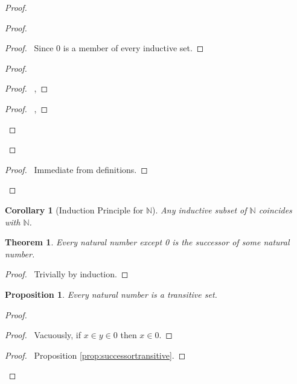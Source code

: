 \documentclass{book}
\let\qed\relax
\newtheorem{prop}[ax]{Proposition}
\newtheorem{cor}{Corollary}[ax]
\newtheorem{thm}[ax]{Theorem}
\theoremstyle{definition}
\begin{document}
\begin{proof}
\pf
{}
\begin{proof}
	\begin{proof}
		\pf\ Since $0$ is a member of every inductive set.
	\end{proof}
	\begin{proof}
		\begin{proof}
			\pf\ , 
		\end{proof}
		\begin{proof}
			\pf\ , 
		\end{proof}
	\end{proof}
\end{proof}
\begin{proof}
	\pf\ Immediate from definitions.
\end{proof}
\qed
\end{proof}

\begin{cor}[Induction Principle for $\mathbb{N}$]
Any inductive subset of $\mathbb{N}$ coincides with $\mathbb{N}$.
\end{cor}

\begin{thm}
\label{thm:zeroorsucc}
Every natural number except 0 is the successor of some natural number.
\end{thm}

\begin{proof}
\pf\ Trivially by induction. \qed
\end{proof}

\begin{prop}
\label{prop:nattrans}
Every natural number is a transitive set.
\end{prop}

\begin{proof}
\pf
{}
\begin{proof}
	\pf\ Vacuously, if $x \in y \in 0$ then $x \in 0$.
\end{proof}
\begin{proof}
	\pf\ Proposition \ref{prop:successortransitive}.
\end{proof}
\qed
\end{proof}
\end{document}

